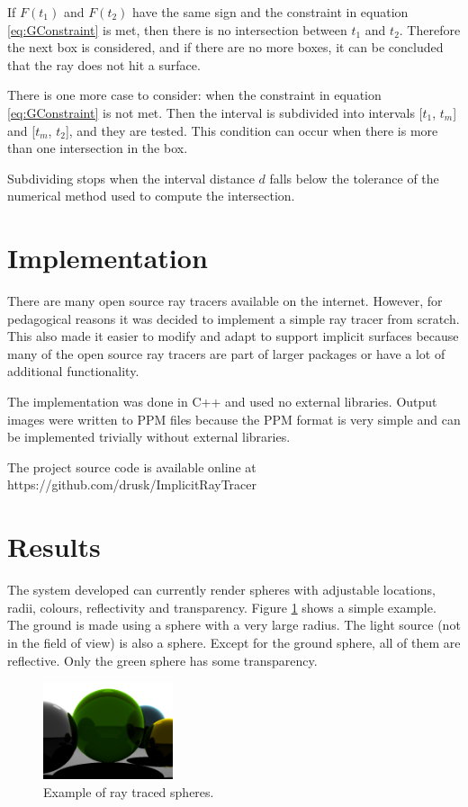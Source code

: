 \documentclass[conference]{acmsiggraph}
\begin{document}
If $F(t_1)$ and $F(t_2)$ have the same sign and the constraint in
equation \ref{eq:GConstraint} is met, then there is no intersection
between $t_1$ and $t_2$.  Therefore the next box is considered,
and if there are no more boxes, it can be concluded that the ray
does not hit a surface.

There is one more case to consider: when the constraint in equation
\ref{eq:GConstraint} is not met.  Then the interval is subdivided into
intervals [$t_1$, $t_m$] and [$t_m$, $t_2$], and they are tested.
This condition can occur when there is more than one intersection
in the box.

Subdividing stops when the interval distance $d$ falls below the
tolerance of the numerical method used to compute the intersection.

\section{Implementation}

There are many open source ray tracers available on the internet.  However, 
for pedagogical reasons it was decided to implement a simple ray tracer from 
scratch.  This also made it easier to modify and adapt to support implicit
surfaces because many of the open source ray tracers are part of larger 
packages or have a lot of additional functionality.

The implementation was done in C++ and used no external libraries.  Output 
images were written to PPM \cite{PPM} files because the PPM format is 
very simple and can be implemented trivially without external libraries.

The project source code is available online at 
https://github.com/drusk/ImplicitRayTracer

\section{Results}

The system developed can currently render spheres with adjustable locations,
radii, colours, reflectivity and transparency.  Figure \ref{fig:spheres} shows a
simple example.  The ground is made using a sphere with a very large radius.
The light source (not in the field of view) is also a sphere.  Except for the
ground sphere, all of them are reflective.  Only the green sphere has some
transparency.

\begin{figure}[ht]
  \centering
  \includegraphics[width=1.5in]{figures/spheres.png}
  \caption{Example of ray traced spheres.}
  \label{fig:spheres}
\end{figure}
\end{document}
